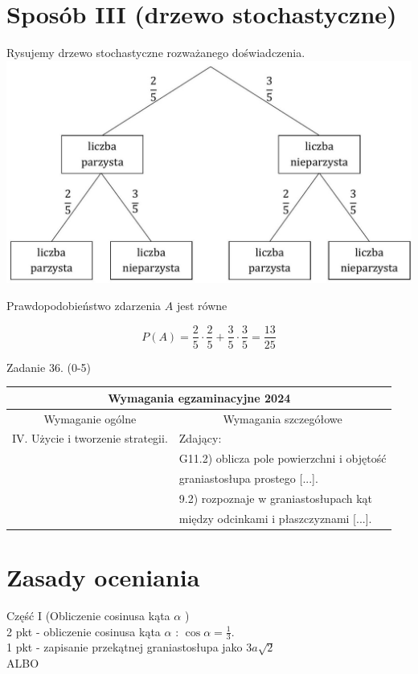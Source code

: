 \documentclass[10pt]{article}
\begin{document}
\section*{Sposób III (drzewo stochastyczne)}
Rysujemy drzewo stochastyczne rozważanego doświadczenia.\\
\includegraphics[max width=\textwidth, center]{2025_02_07_7750073b5ff18154e9e8g-31}

Prawdopodobieństwo zdarzenia $A$ jest równe

$$
P(A)=\frac{2}{5} \cdot \frac{2}{5}+\frac{3}{5} \cdot \frac{3}{5}=\frac{13}{25}
$$

Zadanie 36. (0-5)

\begin{center}
\begin{tabular}{|l|l|}
\hline
\multicolumn{2}{|c|}{Wymagania egzaminacyjne 2024} \\
\hline
\multicolumn{1}{|c|}{Wymaganie ogólne} & \multicolumn{1}{c|}{Wymagania szczegółowe} \\
\hline
IV. Użycie i tworzenie strategii. & Zdający: \\
 & G11.2) oblicza pole powierzchni i objętość \\
 & graniastosłupa prostego [...]. \\
 & 9.2) rozpoznaje w graniastosłupach kąt \\
 & między odcinkami i płaszczyznami [...]. \\
\hline
\end{tabular}
\end{center}

\section*{Zasady oceniania}
Część I (Obliczenie cosinusa kąta $\alpha$ )\\
2 pkt - obliczenie cosinusa kąta $\alpha$ : $\cos \alpha=\frac{1}{3}$.\\
1 pkt - zapisanie przekątnej graniastosłupa jako $3 a \sqrt{2}$\\
ALBO
\end{document}
